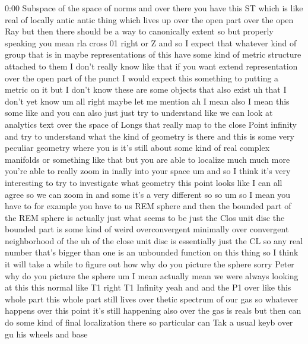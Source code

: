 \begin{unfinished}{0:00}
Subspace  of  the  space  of  norms  and  over
there  you  have
this  ST  which
is  like  real  of  locally  antic  antic
thing  which  lives  up  over  the  open  part
over  the  open  Ray  but  then  there  should
be  a  way  to  canonically
extent  so  but  properly  speaking  you  mean
rla  cross  01  right  or
Z
and
so  I  expect  that  whatever  kind  of  group
that  is
in  maybe  representations  of  this  have
some  kind  of  metric  structure  attached
to  them  I  don't  really  know  like  that  if
you  want  extend  representation  over  the
open  part  of  the  punct  I  would  expect
this  something  to  putting  a  metric  on  it
but
I  don't
know  these  are  some  objects  that  also
exist
uh  that  I  don't  yet  know
um  all  right  maybe  let  me
mention  ah  I  mean  also  I  mean  this  some
like  and  you  can  also  just  just  try  to
understand  like  we  can  look  at  analytics
text  over  the  space  of  Longs  that  really
map  to  the  close  Point  infinity  and  try
to  understand  what  the  kind  of  geometry
is  there  and  this  is  some  very  peculiar
geometry  where  you  is  it's  still  about
some  kind  of  real  complex  manifolds  or
something  like  that  but  you  are  able  to
localize  much  much  more  you're  able  to
really  zoom  in  inally  into  your  space  um
and  so  I  think  it's  very  interesting  to
try  to  investigate  what  geometry  this
point  looks  like  I  can  all
agree  so  we  can  zoom
in  and  some
it's  a  very
different  so  so  um  so  I  mean  you  have  to
for  example  you  have  to  us  REM
sphere  and  then  the  bounded  part  of  the
REM  sphere  is
actually  just  what  seems  to  be  just  the
Clos  unit  disc  the  bounded  part  is  some
kind  of  weird
overconvergent  minimally  over  convergent
neighborhood  of  the  uh  of  the  close  unit
disc
is  essentially  just  the
CL  so  any  real  number  that's  bigger  than
one  is  an  unbounded  function  on  this
thing
so  I  think  it  will  take  a  while  to
figure  out  how  why  do  you  picture  the
sphere  sorry  Peter  why  do  you  picture
the
sphere  um  I  mean  actually  mean  we  were
always  looking  at  this  this  normal  like
T1  right  T1  Infinity  yeah  and  and  the  P1
over  like  this  whole
part  this  whole  part  still  lives  over
thetic  spectrum  of  our
gas  so  whatever  happens  over  this  point
it's
still  happening  also  over  the  gas  is
reals  but
then  can  do  some  kind  of  final
localization  there  so  particular  can  Tak
a  usual  keyb  over  gu  his  wheels  and  base

\end{unfinished}
